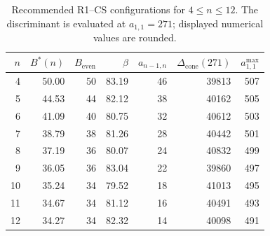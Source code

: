 \begin{table}[pos=t,width=238.25444pt]
        \centering
\begin{minipage}{\ifdim\linewidth>238.25444pt238.25444pt\else\linewidth\fi}

        \caption{Recommended R1--CS configurations for $4\le n\le12$.
        The discriminant is evaluated at $a_{1,1}=271$; displayed
        numerical values are rounded.}
        \label{tab:r1cs-recommended-parameters}
        \small
        \setlength{\tabcolsep}{5pt}
        \begin{tabular}{rrrrrrr}
            \toprule
            $n$ & $B^*(n)$ & $B_{\mathrm{even}}$ & $\beta$
            & $a_{n-1,n}$ & $\Delta_{\mathrm{cone}}(271)$
            & $a_{1,1}^{\max}$ \\
            \midrule
             4 & 50.00 & 50 & 83.19 & 46 & 39813 & 507 \\
             5 & 44.53 & 44 & 82.12 & 38 & 40162 & 505 \\
             6 & 41.09 & 40 & 80.75 & 32 & 40612 & 503 \\
             7 & 38.79 & 38 & 81.26 & 28 & 40442 & 501 \\
             8 & 37.19 & 36 & 80.07 & 24 & 40832 & 499 \\
             9 & 36.05 & 36 & 83.04 & 22 & 39860 & 497 \\
            10 & 35.24 & 34 & 79.52 & 18 & 41013 & 495 \\
            11 & 34.67 & 34 & 81.12 & 16 & 40491 & 493 \\
            12 & 34.27 & 34 & 82.32 & 14 & 40098 & 491 \\
            \bottomrule
        \end{tabular}
    \end{minipage}
\end{table}